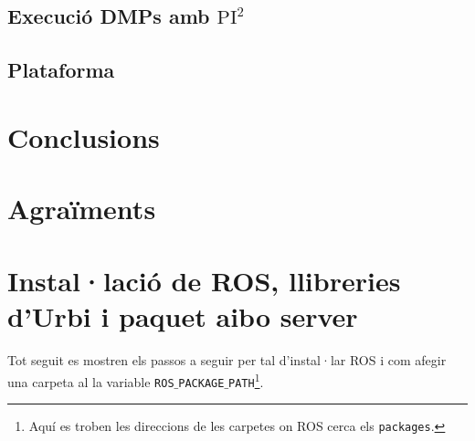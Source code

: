 \documentclass[12pt,a4paper,final,twoside]{article}
\begin{document}
\subsection{Execució DMPs amb $\mathrm{PI^2}$}
\subsection{Plataforma}

\newpage
\section{Conclusions}

\newpage
\section*{Agraïments}

\newpage

\label{Referencies}




\appendix
\clearpage %
\addappheadtotoc
\appendixpage

\section{Instal·lació de ROS, llibreries d'Urbi i paquet aibo server}

\paragraph{}Tot seguit es mostren els passos a seguir per tal d'instal·lar ROS i com afegir una carpeta al la variable \texttt{ROS$\_$PACKAGE$\_$PATH}\footnote{Aquí es troben les direccions de les carpetes on ROS cerca els \texttt{packages}.}.
\end{document}
